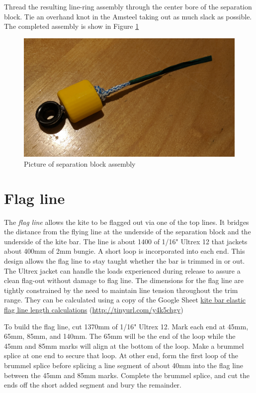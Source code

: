 \documentclass[]{book}
\begin{document}
Thread the resulting line-ring assembly through the center bore of the separation block. Tie an overhand knot in the Amsteel taking out as much slack as possible. The completed assembly is show in Figure \ref{fig:finished-separation-block-assembly}

\begin{figure}

{\centering \includegraphics[width=0.7\linewidth]{images/finished_separation_block_assembly} 

}

\caption{Picture of separation block assembly}\label{fig:finished-separation-block-assembly}
\end{figure}

\hypertarget{flag-line}{%
\section{Flag line}\label{flag-line}}

The \emph{flag line} allows the kite to be flagged out via one of the top lines. It bridges the distance from the flying line at the underside of the separation block and the underside of the kite bar. The line is about 1400 of 1/16" Ultrex 12 that jackets about 400mm of 2mm bungie. A short loop is incorporated into each end. This design allows the flag line to stay taught whether the bar is trimmed in or out. The Ultrex jacket can handle the loads experienced during release to assure a clean flag-out without damage to flag line. The dimensions for the flag line are tightly constrained by the need to maintain line tension throughout the trim range. They can be calculated using a copy of the Google Sheet \href{http://tinyurl.com/y4k5chgv}{kite bar elastic flag line length calculations} (\url{http://tinyurl.com/y4k5chgv})

To build the flag line, cut 1370mm of 1/16" Ultrex 12. Mark each end at 45mm, 65mm, 85mm, and 140mm. The 65mm will be the end of the loop while the 45mm and 85mm marks will align at the bottom of the loop. Make a brummel splice at one end to secure that loop. At other end, form the first loop of the brummel splice before splicing a line segment of about 40mm into the flag line between the 45mm and 85mm marks. Complete the brummel splice, and cut the ends off the short added segment and bury the remainder.
\end{document}

